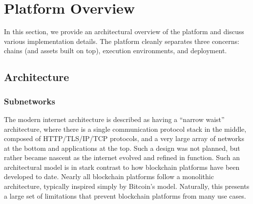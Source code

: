 \documentclass[runningheads]{llncs}
\begin{document}
\section{Platform Overview}
\label{section:platform_overview}
In this section, we provide an architectural overview of the platform and discuss various implementation details. The \AVAPlatformName{} platform cleanly separates three concerns: chains (and assets built on top), execution environments, and deployment.

\subsection{Architecture}

\subsubsection{Subnetworks} 
The modern internet architecture is described as having a ``narrow waist'' architecture, where there is a single communication protocol stack in the middle, composed of HTTP/TLS/IP/TCP protocols, and a very large array of networks at the bottom and applications at the top. Such a design was not planned, but rather became nascent as the internet evolved and refined in function. Such an architectural model is in stark contrast to how blockchain platforms have been developed to date. Nearly all blockchain platforms follow a monolithic architecture, typically inspired simply by Bitcoin's model. Naturally, this presents a large set of limitations that prevent blockchain platforms from many use cases. 
\end{document}
